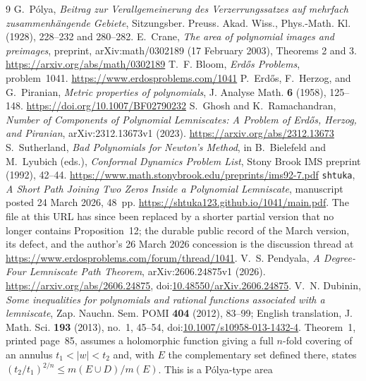 \documentclass[11pt]{article}
\begin{document}
\begin{thebibliography}{9}
 G.~P\'olya,
  \emph{Beitrag zur Verallgemeinerung des Verzerrungssatzes auf mehrfach
  zusammenh\"angende Gebiete}, Sitzungsber. Preuss. Akad. Wiss.,
  Phys.-Math. Kl. (1928), 228--232 and 280--282.
 E.~Crane, \emph{The area of polynomial images and preimages},
  preprint, arXiv:math/0302189 (17 February 2003), Theorems 2 and 3.
  \url{https://arxiv.org/abs/math/0302189}
 T.~F. Bloom, \emph{Erd\H{o}s Problems}, problem~1041.
  \url{https://www.erdosproblems.com/1041}
 P.~Erd\H{o}s, F.~Herzog, and G.~Piranian,
  \emph{Metric properties of polynomials}, J. Analyse Math. \textbf{6}
  (1958), 125--148. \url{https://doi.org/10.1007/BF02790232}
 S.~Ghosh and K.~Ramachandran,
  \emph{Number of Components of Polynomial Lemniscates: A Problem of Erd\H{o}s,
  Herzog, and Piranian}, arXiv:2312.13673v1 (2023).
  \url{https://arxiv.org/abs/2312.13673}
 S.~Sutherland,
  \emph{Bad Polynomials for Newton's Method}, in B.~Bielefeld and M.~Lyubich
  (eds.), \emph{Conformal Dynamics Problem List}, Stony Brook IMS preprint
  (1992), 42--44.
  \url{https://www.math.stonybrook.edu/preprints/ims92-7.pdf}
 \texttt{shtuka},
  \emph{A Short Path Joining Two Zeros Inside a Polynomial Lemniscate},
  manuscript posted 24 March 2026, 48~pp.
  \url{https://shtuka123.github.io/1041/main.pdf}.
  The file at this URL has since been replaced by a shorter partial version
  that no longer contains Proposition~12; the durable public record of the
  March version, its defect, and the author's 26 March 2026 concession is the
  discussion thread at
  \url{https://www.erdosproblems.com/forum/thread/1041}.
 V.~S. Pendyala,
  \emph{A Degree-Four Lemniscate Path Theorem},
  arXiv:2606.24875v1 (2026).
  \url{https://arxiv.org/abs/2606.24875},
  doi:\href{https://doi.org/10.48550/arXiv.2606.24875}
  {10.48550/arXiv.2606.24875}.
 V.~N. Dubinin, \emph{Some inequalities for polynomials and
  rational functions associated with a lemniscate}, Zap. Nauchn. Sem. POMI
  \textbf{404} (2012), 83--99; English translation, J. Math. Sci. \textbf{193}
  (2013), no.~1, 45--54,
  doi:\href{https://doi.org/10.1007/s10958-013-1432-4}{10.1007/s10958-013-1432-4}.
  Theorem~1, printed page~85, assumes a holomorphic function giving a full
  $n$-fold covering of an annulus $t_1<|w|<t_2$ and, with $E$ the
  complementary set defined there, states
  $(t_2/t_1)^{2/n}\le m(E\cup D)/m(E)$.  This is a P\'olya-type area

\end{thebibliography}
\end{document}
